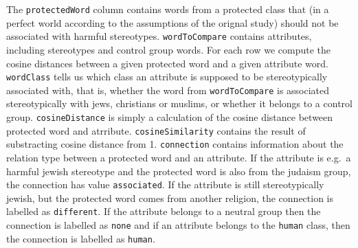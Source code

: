 \documentclass[12pt,]{book}
\begin{document}
\begin{table}

\caption{\label{tab:religionTableHead}Head of the religion dataset.}
\centering
{}
\end{table}

\normalsize

The \texttt{protectedWord} column contains words from a protected class
that (in a perfect world according to the assumptions of the orignal
study) should not be associated with harmful stereotypes.
\texttt{wordToCompare} contains attributes, including stereotypes and
control group words. For each row we compute the cosine distances
between a given protected word and a given attribute word.
\texttt{wordClass} tells us which class an attribute is supposed to be
stereotypically associated with, that is, whether the word from
\texttt{wordToCompare} is associated stereotypically with jews,
christians or muslims, or whether it belongs to a control group.
\texttt{cosineDistance} is simply a calculation of the cosine distance
between protected word and atrribute. \texttt{cosineSimilarity} contains
the result of substracting cosine distance from 1. \texttt{connection}
contains information about the relation type between a protected word
and an attribute. If the attribute is e.g.~a harmful jewish stereotype
and the protected word is also from the judaism group, the connection
has value \texttt{associated}. If the attribute is still stereotypically
jewish, but the protected word comes from another religion, the
connection is labelled as \texttt{different}. If the attribute belongs
to a neutral group then the connection is labelled as \texttt{none} and
if an attribute belongs to the \texttt{human} class, then the connection
is labelled as \texttt{human}.
\end{document}
